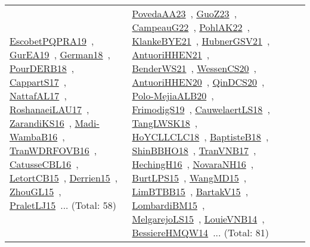 {\begin{longtable}{lp{3cm}>{\raggedright\arraybackslash}p{6cm}>{\raggedright\arraybackslash}p{6cm}>{\raggedright\arraybackslash}p{8cm}}
\href{works/EscobetPQPRA19.pdf}{EscobetPQPRA19}~\cite{EscobetPQPRA19}, \href{works/GurEA19.pdf}{GurEA19}~\cite{GurEA19}, \href{works/German18.pdf}{German18}~\cite{German18}, \href{works/PourDERB18.pdf}{PourDERB18}~\cite{PourDERB18}, \href{works/CappartS17.pdf}{CappartS17}~\cite{CappartS17}, \href{works/NattafAL17.pdf}{NattafAL17}~\cite{NattafAL17}, \href{works/RoshanaeiLAU17.pdf}{RoshanaeiLAU17}~\cite{RoshanaeiLAU17}, \href{works/ZarandiKS16.pdf}{ZarandiKS16}~\cite{ZarandiKS16}, \href{works/Madi-WambaB16.pdf}{Madi-WambaB16}~\cite{Madi-WambaB16}, \href{works/TranWDRFOVB16.pdf}{TranWDRFOVB16}~\cite{TranWDRFOVB16}, \href{works/CatusseCBL16.pdf}{CatusseCBL16}~\cite{CatusseCBL16}, \href{works/LetortCB15.pdf}{LetortCB15}~\cite{LetortCB15}, \href{works/Derrien15.pdf}{Derrien15}~\cite{Derrien15}, \href{works/ZhouGL15.pdf}{ZhouGL15}~\cite{ZhouGL15}, \href{works/PraletLJ15.pdf}{PraletLJ15}~\cite{PraletLJ15}... (Total: 58) & \href{works/PovedaAA23.pdf}{PovedaAA23}~\cite{PovedaAA23}, \href{works/GuoZ23.pdf}{GuoZ23}~\cite{GuoZ23}, \href{works/CampeauG22.pdf}{CampeauG22}~\cite{CampeauG22}, \href{works/PohlAK22.pdf}{PohlAK22}~\cite{PohlAK22}, \href{works/KlankeBYE21.pdf}{KlankeBYE21}~\cite{KlankeBYE21}, \href{works/HubnerGSV21.pdf}{HubnerGSV21}~\cite{HubnerGSV21}, \href{works/AntuoriHHEN21.pdf}{AntuoriHHEN21}~\cite{AntuoriHHEN21}, \href{works/BenderWS21.pdf}{BenderWS21}~\cite{BenderWS21}, \href{works/WessenCS20.pdf}{WessenCS20}~\cite{WessenCS20}, \href{works/AntuoriHHEN20.pdf}{AntuoriHHEN20}~\cite{AntuoriHHEN20}, \href{works/QinDCS20.pdf}{QinDCS20}~\cite{QinDCS20}, \href{works/Polo-MejiaALB20.pdf}{Polo-MejiaALB20}~\cite{Polo-MejiaALB20}, \href{works/FrimodigS19.pdf}{FrimodigS19}~\cite{FrimodigS19}, \href{works/CauwelaertLS18.pdf}{CauwelaertLS18}~\cite{CauwelaertLS18}, \href{works/TangLWSK18.pdf}{TangLWSK18}~\cite{TangLWSK18}, \href{works/HoYCLLCLC18.pdf}{HoYCLLCLC18}~\cite{HoYCLLCLC18}, \href{works/BaptisteB18.pdf}{BaptisteB18}~\cite{BaptisteB18}, \href{works/ShinBBHO18.pdf}{ShinBBHO18}~\cite{ShinBBHO18}, \href{works/TranVNB17.pdf}{TranVNB17}~\cite{TranVNB17}, \href{works/HechingH16.pdf}{HechingH16}~\cite{HechingH16}, \href{works/NovaraNH16.pdf}{NovaraNH16}~\cite{NovaraNH16}, \href{works/BurtLPS15.pdf}{BurtLPS15}~\cite{BurtLPS15}, \href{works/WangMD15.pdf}{WangMD15}~\cite{WangMD15}, \href{works/LimBTBB15.pdf}{LimBTBB15}~\cite{LimBTBB15}, \href{works/BartakV15.pdf}{BartakV15}~\cite{BartakV15}, \href{works/LombardiBM15.pdf}{LombardiBM15}~\cite{LombardiBM15}, \href{works/MelgarejoLS15.pdf}{MelgarejoLS15}~\cite{MelgarejoLS15}, \href{works/LouieVNB14.pdf}{LouieVNB14}~\cite{LouieVNB14}, \href{works/BessiereHMQW14.pdf}{BessiereHMQW14}~\cite{BessiereHMQW14}... (Total: 81)\\

\end{longtable}}

